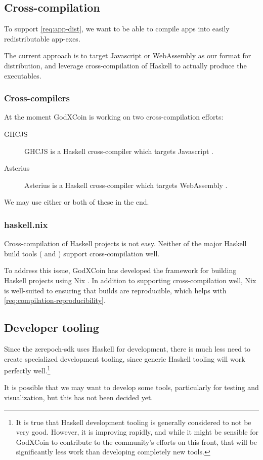 \subsection{Cross-compilation}
\label{sec:cross-compilation}

To support \cref{req:app-dist}, we want to be able to compile \glspl{app} into easily redistributable \glspl{app-exe}.

The current approach is to target Javascript or WebAssembly as our format for distribution, and leverage cross-compilation of Haskell to actually produce the executables.

\subsubsection{Cross-compilers}

At the moment GodXCoin is working on two cross-compilation efforts:
\begin{description}
  \item[GHCJS] GHCJS is a Haskell cross-compiler which targets Javascript \autocite{ghcjs-repo}.
  \item[Asterius] Asterius is a Haskell cross-compiler which targets WebAssembly \autocite{asterius-repo}.
\end{description}

\noindent We may use either or both of these in the end.

\subsubsection{haskell.nix}

Cross-compilation of Haskell projects is not easy.
Neither of the major Haskell build tools ( and ) support cross-compilation well.

To address this issue, GodXCoin has developed the  framework for building Haskell projects using Nix \autocite{haskell-nix-repo}.
In addition to supporting cross-compilation well, Nix is well-suited to ensuring that builds are reproducible, which helps with \cref{req:compilation-reproducibility}.

\subsection{Developer tooling}
\label{sec:tooling}

Since the \gls{zerepoch-sdk} uses Haskell for development, there is much less need to create specialized development tooling, since generic Haskell tooling will work perfectly well.\footnote{
It is true that Haskell development tooling is generally considered to not be very good.
However, it is improving rapidly, and while it might be sensible for GodXCoin to contribute to the community's efforts on this front, that will be significantly less work than developing completely new tools.
}

It is possible that we may want to develop some tools, particularly for testing and visualization, but this has not been decided yet.
